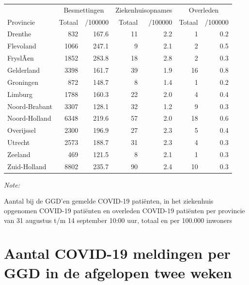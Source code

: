 \documentclass[
  english,
  man,floatsintext]{apa6}
\begin{document}
\begin{table}
\centering
\begin{threeparttable}
\begin{tabular}{lrrrrrr}
\toprule
\multicolumn{1}{c}{ } & \multicolumn{2}{c}{Besmettingen} & \multicolumn{2}{c}{Ziekenhuisopnames} & \multicolumn{2}{c}{Overleden} \\
\cmidrule(l{3pt}r{3pt}){2-3} \cmidrule(l{3pt}r{3pt}){4-5} \cmidrule(l{3pt}r{3pt}){6-7}
Provincie & Totaal & /100000 & Totaal & /100000 & Totaal & /100000\\
\midrule
Drenthe & 832 & 167.6 & 11 & 2.2 & 1 & 0.2\\
Flevoland & 1066 & 247.1 & 9 & 2.1 & 2 & 0.5\\
FryslÃ¢n & 1852 & 283.8 & 18 & 2.8 & 2 & 0.3\\
Gelderland & 3398 & 161.7 & 39 & 1.9 & 16 & 0.8\\
Groningen & 872 & 148.7 & 8 & 1.4 & 1 & 0.2\\
Limburg & 1788 & 160.3 & 22 & 2.0 & 4 & 0.4\\
Noord-Brabant & 3307 & 128.1 & 32 & 1.2 & 9 & 0.3\\
Noord-Holland & 6348 & 219.6 & 57 & 2.0 & 18 & 0.6\\
Overijssel & 2300 & 196.9 & 27 & 2.3 & 5 & 0.4\\
Utrecht & 2573 & 188.7 & 31 & 2.3 & 4 & 0.3\\
Zeeland & 469 & 121.5 & 8 & 2.1 & 1 & 0.3\\
Zuid-Holland & 8802 & 235.7 & 90 & 2.4 & 10 & 0.3\\
\bottomrule
\end{tabular}
\begin{tablenotes}
\item \textit{Note: } 
\item Aantal bij de GGD’en gemelde COVID-19 patiënten, in het ziekenhuis opgenomen COVID-19 patiënten en overleden COVID-19 patiënten per provincie van 31 augustus t/m 14 september 10:00 uur, totaal en per 100.000 inwoners
\end{tablenotes}
\end{threeparttable}
\end{table}

\newpage

\hypertarget{aantal-covid-19-meldingen-per-ggd-in-de-afgelopen-twee-weken}{%
\section{Aantal COVID-19 meldingen per GGD in de afgelopen twee weken}\label{aantal-covid-19-meldingen-per-ggd-in-de-afgelopen-twee-weken}}
\end{document}
